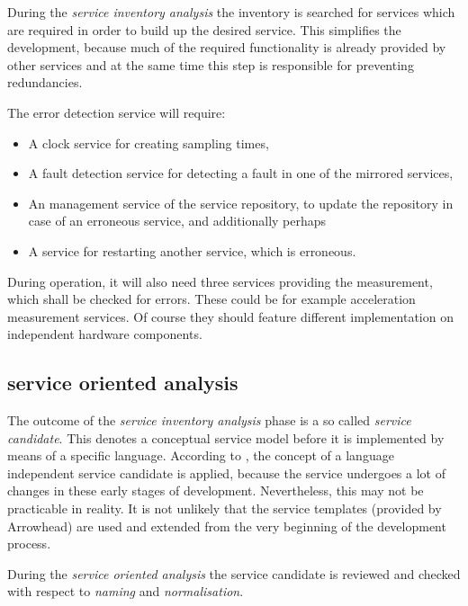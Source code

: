 During the \emph{service inventory analysis} the inventory is searched for services which are required in order to build up the desired service. This simplifies the development, because much of the required functionality is already provided by other services and at the same time this step is responsible for preventing redundancies.

\begin{mdframed}
The error detection service will require:
\begin{itemize}
\item A clock service for creating sampling times,
\item A fault detection service for detecting a fault in one of the mirrored services,
\item An management service of the service repository, to update the repository in case of an erroneous service, and additionally perhaps
\item A service for restarting another service, which is erroneous.
\end{itemize}

During operation, it will also need three services providing the measurement, which shall be checked for errors. These could be for example acceleration measurement services. Of course they should feature different implementation on independent hardware components.
\end{mdframed}




\subsection{service oriented analysis}

The outcome of the \emph{service inventory analysis} phase is a so called \emph{service candidate}. This denotes a conceptual service model before it is implemented by means of a specific language. According to \cite[p.42]{erl2011}, the concept of a language independent service candidate is applied, because the service undergoes a lot of changes in these early stages of development. Nevertheless, this may not be practicable in reality. It is not unlikely that the service templates (provided by Arrowhead) are used and extended from the very beginning of the development process.

During the \emph{service oriented analysis} the service candidate is reviewed and checked with respect to \emph{naming} and \emph{normalisation}.


